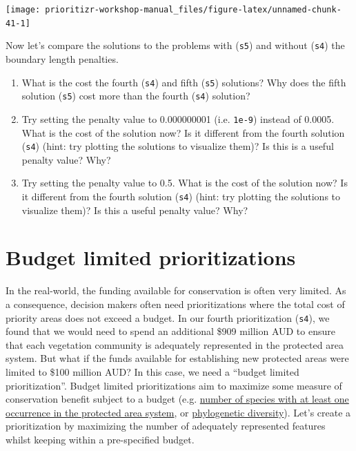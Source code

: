\documentclass[12pt,]{book}
\providecommand{\tightlist}{%
  \setlength{\itemsep}{0pt}\setlength{\parskip}{0pt}}
\let\BeginKnitrBlock\begin \let\EndKnitrBlock\end
\begin{document}
\begin{center}\texttt{[image: prioritizr-workshop-manual\_files/figure-latex/unnamed-chunk-41-1]} \end{center}

Now let's compare the solutions to the problems with (\texttt{s5}) and
without (\texttt{s4}) the boundary length penalties.

\BeginKnitrBlock{rmdquestion}
\begin{enumerate}
\def\labelenumi{\arabic{enumi}.}
\tightlist
\item
  What is the cost the fourth (\texttt{s4}) and fifth (\texttt{s5})
  solutions? Why does the fifth solution (\texttt{s5}) cost more than
  the fourth (\texttt{s4}) solution?
\item
  Try setting the penalty value to 0.000000001 (i.e. \texttt{1e-9})
  instead of 0.0005. What is the cost of the solution now? Is it
  different from the fourth solution (\texttt{s4}) (hint: try plotting
  the solutions to visualize them)? Is this is a useful penalty value?
  Why?
\item
  Try setting the penalty value to 0.5. What is the cost of the solution
  now? Is it different from the fourth solution (\texttt{s4}) (hint: try
  plotting the solutions to visualize them)? Is this a useful penalty
  value? Why?
\end{enumerate}
\EndKnitrBlock{rmdquestion}

\clearpage

\section{Budget limited
prioritizations}\label{budget-limited-prioritizations}

In the real-world, the funding available for conservation is often very
limited. As a consequence, decision makers often need prioritizations
where the total cost of priority areas does not exceed a budget. In our
fourth prioritization (\texttt{s4}), we found that we would need to
spend an additional \$909 million AUD to ensure that each vegetation
community is adequately represented in the protected area system. But
what if the funds available for establishing new protected areas were
limited to \$100 million AUD? In this case, we need a ``budget limited
prioritization''. Budget limited prioritizations aim to maximize some
measure of conservation benefit subject to a budget (e.g.
\href{https://prioritizr.net/reference/add_max_cover_objective.html}{number
of species with at least one occurrence in the protected area system},
or
\href{https://prioritizr.net/reference/add_max_phylo_div_objective.html}{phylogenetic
diversity}). Let's create a prioritization by maximizing the number of
adequately represented features whilst keeping within a pre-specified
budget.
\end{document}

